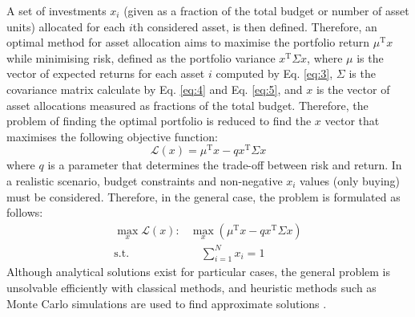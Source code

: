\documentclass[prx,twocolumn,floatfix,superscriptaddress,longbibliography]{revtex4-1}
\begin{document}
A set of investments $x_i$ (given as a fraction of the total budget or number of asset units) allocated for each $i$th considered asset, 
is then defined. Therefore, an optimal method for asset allocation aims to maximise the portfolio return 
$\mu^\text{T} x$ while minimising risk, defined as the portfolio variance $x^\text{T}\Sigma x$, where $\mu$ is the vector of expected returns for each asset $i$ computed by Eq. \ref{eq:3}, $\Sigma$ is the covariance matrix calculate by Eq. \ref{eq:4} and Eq. \ref{eq:5}, and $x$ is the vector 
of asset allocations measured as fractions of the total budget. Therefore, the problem of finding the optimal portfolio is reduced to find the $x$ vector that maximises the following objective function: 
\begin{equation}
  \label{eq:6}
  \mathcal{L}(x) = \mu^\text{T} x - q x^\text{T}\Sigma x
\end{equation}
where $q$ is a parameter that determines the trade-off between risk and return.  In a realistic scenario, budget constraints and non-negative 
$x_i$ values (only buying) must be considered. Therefore, in the general case, the problem is formulated as follows:
\begin{equation}
\begin{aligned}
  \label{eq:7}
  \max_{x} \mathcal{L}(x): & \max_{x}\left(\mu^\text{T} x - q x^\text{T}\Sigma x \right) \\ 
  \text{s.t.} & \quad \sum_{i=1}^{N} x_i = 1 
\end{aligned}
\end{equation}
Although analytical solutions exist for particular cases, the general problem is unsolvable efficiently with classical methods, and 
heuristic methods such as Monte Carlo simulations are used to find approximate solutions \cite{Shadabfar2020}.
\end{document}
